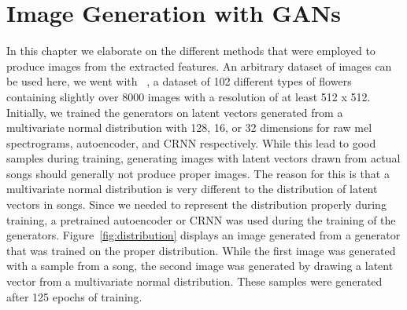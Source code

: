 \chapter{Image Generation with GANs}\label{ch:generation}

    In this chapter we elaborate on the different methods that were employed to produce images from the extracted features. An arbitrary dataset of images can be used here, we went with ~\cite{102flower}, a dataset of 102 different types of flowers containing slightly over 8000 images with a resolution of at least 512 x 512.\\
    Initially, we trained the generators on latent vectors generated from a multivariate normal distribution with 128, 16, or 32 dimensions for raw mel spectrograms, autoencoder, and CRNN respectively. While this lead to good samples during training, generating images with latent vectors drawn from actual songs should generally not produce proper images. The reason for this is that a multivariate normal distribution is very different to the distribution of latent vectors in songs. Since we needed to represent the distribution properly during training, a pretrained autoencoder or CRNN was used during the training of the generators. Figure~\ref{fig:distribution} displays an image generated from a generator that was trained on the proper distribution. While the first image was generated with a sample from a song, the second image was generated by drawing a latent vector from a multivariate normal distribution. These samples were generated after 125 epochs of training.

